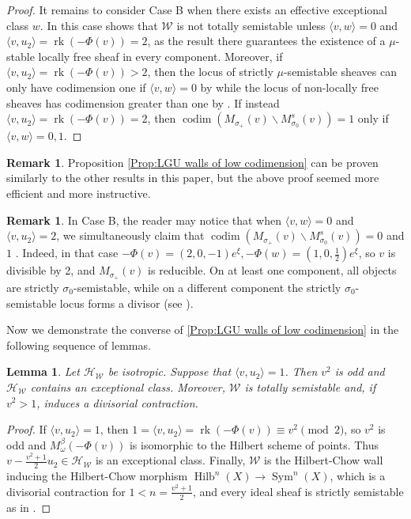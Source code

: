 \documentclass[leqno,11pt]{amsart}
\def\codim{\mathop{\mathrm{codim}}\nolimits}
\def\Hilb{\mathop{\mathrm{Hilb}}\nolimits}
\def\rk{\mathop{\mathrm{rk}}}
\def\Sym{\mathop{\mathrm{Sym}}\nolimits}
\newtheorem{Lem}[Thm]{Lemma}
\theoremstyle{definition}
\newtheorem{Rem}[Thm]{Remark}
\def\HH{\ensuremath{\mathcal H}}
\def\WW{\ensuremath{\mathcal W}}
\begin{document}
\begin{proof}
It remains to consider Case B when there exists an effective exceptional class $w$.  In this case \cite[Lemma 2.8 (2)]{Yos16a} shows that $\WW$ is not totally semistable unless $\langle v,w\rangle=0$ and $\langle v,u_2\rangle=\rk(-\Phi(v))=2$, as the result there guarantees the existence of a $\mu$-stable locally free sheaf in every component.  Moreover, if $\langle v,u_2\rangle=\rk(-\Phi(v))>2$, then the locus of strictly $\mu$-semistable sheaves can only have codimension one if $\langle v,w\rangle=0$ by \cite[Lemma 2.8 (1)]{Yos16a} while the locus of non-locally free sheaves has codimension greater than one by \cite[(2.26) with $\delta=0$]{Yos16a}.  If instead $\langle v,u_2\rangle=\rk(-\Phi(v))=2$, then $\codim(M_{\sigma_+}(v)\backslash M^s_{\sigma_0}(v))=1$ only if $\langle v,w\rangle=0,1$.  
\end{proof}

\begin{Rem}
Proposition \ref{Prop:LGU walls of low codimension} can be proven similarly to the other results in this paper, but the above proof seemed more efficient and more instructive.
\end{Rem}

\begin{Rem}
In Case B, the reader may notice that when $\langle v,w\rangle=0$ and $\langle v,u_2\rangle=2$, we simultaneously claim that $\codim(M_{\sigma_+}(v)\backslash M^s_{\sigma_0}(v))=0$ and $1$ .  Indeed, in that case $-\Phi(v)=(2,0,-1)e^{\xi},-\Phi(w)=(1,0,\frac{1}{2})e^{\xi}$, so $v$ is divisible by 2, and $M_{\sigma_+}(v)$ is reducible.  On at least one component, all objects are strictly $\sigma_0$-semistable, while on a different component the strictly $\sigma_0$-semistable locus forms a divisor (see \cite[Lemma 2.8 (3)]{Yos16a}). 
\end{Rem}
 Now we demonstrate the converse of \ref{Prop:LGU walls of low codimension} in the following sequence of lemmas.
\begin{Lem}\label{Lem: Hilbert-Chow}
Let $\HH_{\WW}$ be isotropic.  Suppose that $\langle v,u_2\rangle=1$.  Then $v^2$ is odd and $\HH_{\WW}$ contains an exceptional class.  Moreover, $\WW$ is totally semistable and, if $v^2>1$, induces a divisorial contraction.  
\end{Lem}
\begin{proof}
If $\langle v,u_2\rangle=1$, then $1=\langle v,u_2\rangle=\rk(-\Phi(v))\equiv v^2\pmod 2$, so $v^2$ is odd and $M_{\omega}^{\beta}(-\Phi(v))$ is isomorphic to the Hilbert scheme of points.  Thus $v-\frac{v^2+1}{2}u_2\in\HH_\WW$ is an exceptional class.  Finally, $\WW$ is the Hilbert-Chow wall inducing the Hilbert-Chow morphism $\Hilb^n(X)\to\Sym^n(X)$, which is a divisorial contraction for $1<n=\frac{v^2+1}{2}$, and every ideal sheaf is strictly semistable as in \cite[Proposition 13.1]{Nue14b}.
\end{proof}
\end{document}
